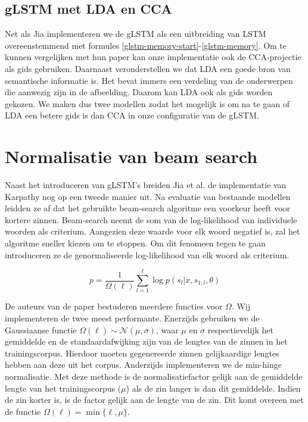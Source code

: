 \subsection{gLSTM met LDA en CCA}
Net als Jia implementeren we de gLSTM als een uitbreiding van LSTM overeenstemmend met formules \ref{glstm-memory-start}-\ref{glstm-memory}.
Om te kunnen vergelijken met hun paper kan onze implementatie ook de CCA-projectie als gids gebruiken.
Daarnaast veronderstellen we dat LDA een goede bron van semantische informatie is. Het bevat immers een verdeling van de onderwerpen die aanwezig zijn in de afbeelding. Daarom kan LDA ook als gids worden gekozen.
We maken dus twee modellen zodat het mogelijk is om na te gaan of LDA een betere gids is dan CCA in onze configuratie van de gLSTM.

\section{Normalisatie van beam search}
Naast het introduceren van gLSTM's breiden Jia et al. \cite{Fernando2015} de implementatie van Karpathy nog op een tweede manier uit. Na evaluatie van bestaande modellen leidden ze af dat het gebruikte beam-search algoritme een voorkeur heeft voor kortere zinnen. Beam-search neemt de som van de log-likelihood van individuele woorden als criterium. Aangezien deze waarde voor elk woord negatief is, zal het algoritme sneller kiezen om te stoppen. Om dit fenomeen tegen te gaan introduceren ze de genormaliseerde log-likelihood van elk woord als criterium.

\begin{equation}
p = \frac{1}{\Omega(\ell)}\sum_{l=1}^{\ell} \log p(s_l | x, s_{1:l}, \theta)
\label{eq:log-sentence-norm}
\end{equation}

De auteurs van de paper bestuderen meerdere functies voor $\Omega$. Wij implementeren de twee meest performante.
Enerzijds gebruiken we de Gaussiaanse functie $\Omega(\ell) \sim \mathcal{N}(\mu, \sigma)$, waar $\mu$ en $\sigma$ respectievelijk het gemiddelde en de standaardafwijking zijn van de lengtes van de zinnen in het trainingscorpus. Hierdoor moeten gegenereerde zinnen gelijkaardige lengtes hebben aan deze uit het corpus. 
Anderzijds implementeren we de min-hinge normalisatie. Met deze methode is de normalisatiefactor gelijk aan de gemiddelde lengte van het trainingscorpus ($\mu$) als de zin langer is dan dit gemiddelde. Indien de zin korter is, is de factor gelijk aan de lengte van de zin. Dit komt overeen met de functie $\Omega(\ell)=\min\{\ell, \mu\}$.

